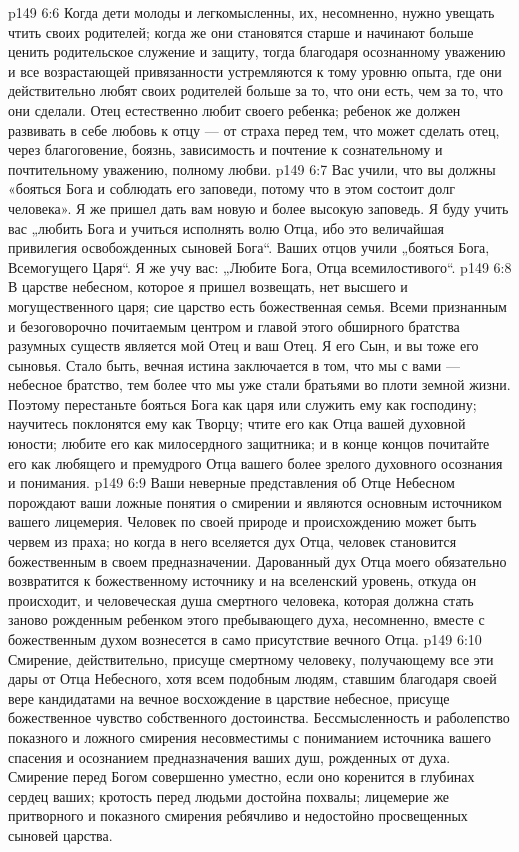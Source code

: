 \vs p149 6:6 Когда дети молоды и легкомысленны, их, несомненно, нужно увещать чтить своих родителей; когда же они становятся старше и начинают больше ценить родительское служение и защиту, тогда благодаря осознанному уважению и все возрастающей привязанности устремляются к тому уровню опыта, где они действительно любят своих родителей больше за то, что они есть, чем за то, что они сделали. Отец естественно любит своего ребенка; ребенок же должен развивать в себе любовь к отцу --- от страха перед тем, что может сделать отец, через благоговение, боязнь, зависимость и почтение к сознательному и почтительному уважению, полному любви.
\vs p149 6:7 Вас учили, что вы должны «бояться Бога и соблюдать его заповеди, потому что в этом состоит долг человека». Я же пришел дать вам новую и более высокую заповедь. Я буду учить вас „любить Бога и учиться исполнять волю Отца, ибо это величайшая привилегия освобожденных сыновей Бога“. Ваших отцов учили „бояться Бога, Всемогущего Царя“. Я же учу вас: „Любите Бога, Отца всемилостивого“.
\vs p149 6:8 В царстве небесном, которое я пришел возвещать, нет высшего и могущественного царя; сие царство есть божественная семья. Всеми признанным и безоговорочно почитаемым центром и главой этого обширного братства разумных существ является мой Отец и ваш Отец. Я его Сын, и вы тоже его сыновья. Стало быть, вечная истина заключается в том, что мы с вами --- небесное братство, тем более что мы уже стали братьями во плоти земной жизни. Поэтому перестаньте бояться Бога как царя или служить ему как господину; научитесь поклонятся ему как Творцу; чтите его как Отца вашей духовной юности; любите его как милосердного защитника; и в конце концов почитайте его как любящего и премудрого Отца вашего более зрелого духовного осознания и понимания.
\vs p149 6:9 Ваши неверные представления об Отце Небесном порождают ваши ложные понятия о смирении и являются основным источником вашего лицемерия. Человек по своей природе и происхождению может быть червем из праха; но когда в него вселяется дух Отца, человек становится божественным в своем предназначении. Дарованный дух Отца моего обязательно возвратится к божественному источнику и на вселенский уровень, откуда он происходит, и человеческая душа смертного человека, которая должна стать заново рожденным ребенком этого пребывающего духа, несомненно, вместе с божественным духом вознесется в само присутствие вечного Отца.
\vs p149 6:10 Смирение, действительно, присуще смертному человеку, получающему все эти дары от Отца Небесного, хотя всем подобным людям, ставшим благодаря своей вере кандидатами на вечное восхождение в царствие небесное, присуще божественное чувство собственного достоинства. Бессмысленность и раболепство показного и ложного смирения несовместимы с пониманием источника вашего спасения и осознанием предназначения ваших душ, рожденных от духа. Смирение перед Богом совершенно уместно, если оно коренится в глубинах сердец ваших; кротость перед людьми достойна похвалы; лицемерие же притворного и показного смирения ребячливо и недостойно просвещенных сыновей царства.
